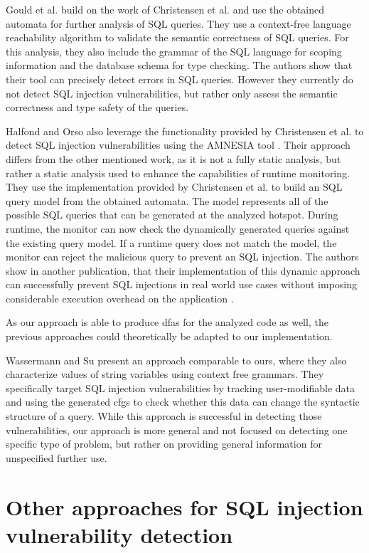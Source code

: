 Gould et al. \cite{gould2004static} build on the work of Christensen et al. and use the obtained automata for further analysis of SQL queries. They use a context-free language reachability algorithm to validate the semantic correctness of SQL queries. For this analysis, they also include the grammar of the SQL language for scoping information and the database schema for type checking.
The authors show that their tool can precisely detect errors in SQL queries. However they currently do not detect SQL injection vulnerabilities, but rather only assess the semantic correctness and type safety of the queries.

Halfond and Orso also leverage the functionality provided by Christensen et al. to detect SQL injection vulnerabilities using the AMNESIA tool \cite{amnesia}. Their approach differs from the other mentioned work, as it is not a fully static analysis, but rather a static analysis used to enhance the capabilities of runtime monitoring. They use the implementation provided by Christensen et al. to build an SQL query model from the obtained automata. The model represents all of the possible SQL queries that can be generated at the analyzed hotspot.
During runtime, the monitor can now check the dynamically generated queries against the existing query model. If a runtime query does not match the model, the monitor can reject the malicious query to prevent an SQL injection. The authors show in another publication, that their implementation of this dynamic approach can successfully prevent SQL injections in real world use cases without imposing considerable execution overhead on the application \cite{amnesia_evaluation}.

As our approach is able to produce \acp{dfa} for the analyzed code as well, the previous approaches could theoretically be adapted to our implementation.

Wassermann and Su \cite{sqli_wassermann_su} present an approach comparable to ours, where they also characterize values of string variables using context free grammars. They specifically target SQL injection vulnerabilities by tracking user-modifiable data and using the generated \acp{cfg} to check whether this data can change the syntactic structure of a query. While this approach is successful in detecting those vulnerabilities, our approach is more general and not focused on detecting one specific type of problem, but rather on providing general information for unspecified further use.

\section{Other approaches for SQL injection vulnerability detection}\label{sec:related:otherSQL}

